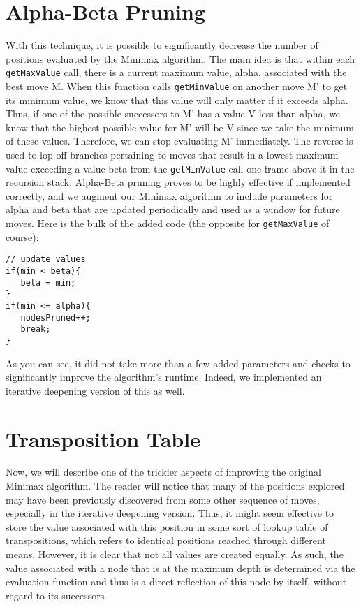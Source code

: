 \documentclass[11pt, oneside]{article}%
\begin{document}
\section{Alpha-Beta Pruning}
With this technique, it is possible to significantly decrease the number of positions evaluated by the Minimax algorithm.  The main idea is that within each \verb`getMaxValue` call, there is a current maximum value, alpha, associated with the best move M.  When this function calls \verb`getMinValue` on another move M' to get its minimum value, we know that this value will only matter if it exceeds alpha.  Thus, if one of the possible successors to M' has a value V less than alpha, we know that the highest possible value for M' will be V since we take the minimum of these values.  Therefore, we can stop evaluating M' immediately.  The reverse is used to lop off branches pertaining to moves that result in a lowest maximum value exceeding a value beta from the \verb`getMinValue` call one frame above it in the recursion stack.  Alpha-Beta pruning proves to be highly effective if implemented correctly, and we augment our Minimax algorithm to include parameters for alpha and beta that are updated periodically and used as a window for future moves.  Here is the bulk of the added code (the opposite for \verb`getMaxValue` of course):

\begin{lstlisting}
// update values
if(min < beta){
   beta = min;
}
if(min <= alpha){
   nodesPruned++;
   break;
}
\end{lstlisting}
As you can see, it did not take more than a few added parameters and checks to significantly improve the algorithm's runtime.  Indeed, we implemented an iterative deepening version of this as well.

\section{Transposition Table}
Now, we will describe one of the trickier aspects of improving the original Minimax algorithm.  The reader will notice that many of the positions explored may have been previously discovered from some other sequence of moves, especially in the iterative deepening version.  Thus, it might seem effective to store the value associated with this position in some sort of lookup table of transpositions, which refers to identical positions reached through different means.  However, it is clear that not all values are created equally.  As such, the value associated with a node that is at the maximum depth is determined via the evaluation function and thus is a direct reflection of this node by itself, without regard to its successors.
\end{document}
